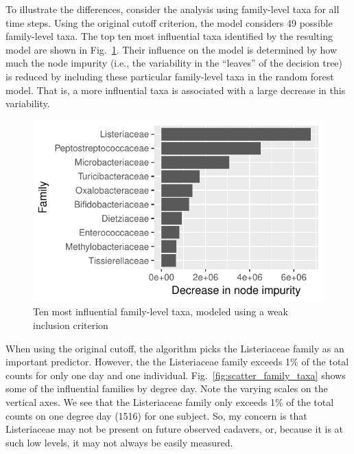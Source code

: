 \documentclass{article}
\begin{document}
To illustrate the differences, consider the analysis using
family-level taxa for all time steps.  Using the original cutoff
criterion, the model considers 49 possible family-level taxa.  The top
ten most influential taxa identified by the resulting model are shown
in Fig.~\ref{fig:infl_family_taxa_orig_crit}.  Their influence on the
model is determined by how much the node impurity (i.e., the
variability in the ``leaves'' of the decision tree) is reduced by
including these particular family-level taxa in the random forest
model.  That is, a more influential taxa is associated with a large
decrease in this variability.

\begin{figure}
  \centering
  \includegraphics{../../only_families/all_time_steps/cutoff_1perc/orig_units_all_data_families_barchart}
  \caption{Ten most influential family-level taxa, modeled using a weak inclusion criterion}
  \label{fig:infl_family_taxa_orig_crit}
\end{figure}


When using the original cutoff, the algorithm picks the Listeriaceae
family as an important predictor.  However, the the Listeriaceae
family exceeds 1\% of the total counts for only one day and one
individual.  Fig.~\ref{fig:scatter_family_taxa} shows some of the
influential families by degree day.  Note the varying scales on the
vertical axes.  We see that the Listeriaceae family only exceeds 1\%
of the total counts on one degree day (1516) for one subject.  So, my
concern is that Listeriaceae may not be present on future observed
cadavers, or, because it is at such low levels, it may not always be
easily measured.
\end{document}
